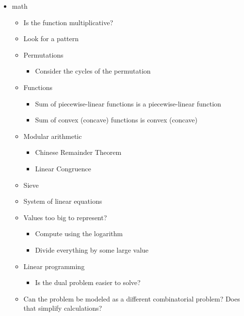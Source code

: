 \documentclass[9pt,a4paper,landscape,oneside]{amsart}
\newenvironment{myitemize}
{\begin{itemize}[leftmargin=.3cm]
	\setlength{\itemsep}{0pt}
	\setlength{\parskip}{0pt}
	\setlength{\parsep}{0pt}     }
{ \end{itemize}                  }
\begin{document}
\begin{multicols*}{3}
\begin{myitemize}
\begin{myitemize}
			\item Lov\'asz Toggle
			\item Look at the DFS tree (which has no cross-edges)
			\item Is the graph a DFA or NFA?
				\begin{myitemize}
					\item Is it the Synchronizing word problem?
				\end{myitemize}
		\end{myitemize}
	\item math
		\begin{myitemize}
			\item Is the function multiplicative?
			\item Look for a pattern
			\item Permutations
				\begin{myitemize}
					\item Consider the cycles of the permutation
				\end{myitemize}
			\item Functions
				\begin{myitemize}
					\item Sum of piecewise-linear functions is a piecewise-linear function
					\item Sum of convex (concave) functions is convex (concave)
				\end{myitemize}
			\item Modular arithmetic
				\begin{myitemize}
					\item Chinese Remainder Theorem
					\item Linear Congruence
				\end{myitemize}
			\item Sieve
			\item System of linear equations
			\item Values too big to represent?
				\begin{myitemize}
					\item Compute using the logarithm
					\item Divide everything by some large value
				\end{myitemize}
			\item Linear programming
				\begin{myitemize}
					\item Is the dual problem easier to solve?
				\end{myitemize}
			\item Can the problem be modeled as a different combinatorial problem? Does that simplify calculations?

\end{myitemize}
\end{myitemize}
\end{multicols*}
\end{document}
